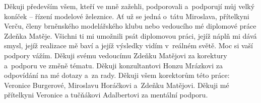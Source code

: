Děkuji především všem, kteří ve mně zažehli, podporovali a~podporují můj velký
koníček – řízení modelové železnice. Ať už se jedná o~tátu
Miroslava, přítelkyni Verču, členy brněnského modelářského klubu nebo vedoucího
mé diplomové práce Zdeňka Matěje. Všichni ti mi umožnili psát diplomovou práci,
jejíž náplň mi dává smysl, jejíž realizace mě baví a jejíž výsledky vidím
v~reálném světě. Moc si vaší podpory vážím.
Děkuji svému vedoucímu Zdeňku Matějovi za korektury a~podporu ve změně tématu.
Děkuji konzultantovi Honzu Mrázkovi za odpovídání na mé dotazy a~za rady.
Děkuji všem korektorům této práce: Veronice Burgerové, Miroslavu Horáčkovi
a~Zdeňku Matějovi.
Děkuji mé přítelkyni Veronice a tučňákovi Adalbertovi za mentální podporu.
